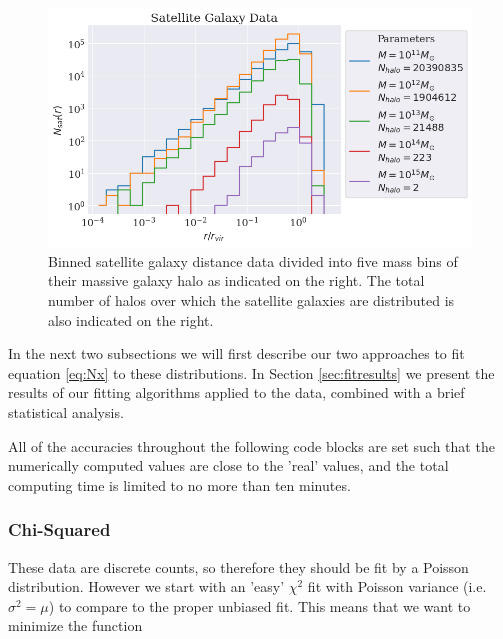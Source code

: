 \begin{figure}
    \centering
    \includegraphics[width=\textwidth]{results/satellite_data.png}
    \caption{Binned satellite galaxy distance data divided into five mass bins of their massive galaxy halo as indicated on the right. The total number of halos over which the satellite galaxies are distributed is also indicated on the right.}
    \label{fig:sat_data}
\end{figure}

In the next two subsections we will first describe our two approaches to fit equation \ref{eq:Nx} to these distributions. In Section \ref{sec:fitresults} we present the results of our fitting algorithms applied to the data, combined with a brief statistical analysis.

All of the accuracies throughout the following code blocks are set such that the numerically computed values are close to the 'real' values, and the total computing time is limited to no more than ten minutes.




\subsubsection{Chi-Squared}

These data are discrete counts, so therefore they should be fit by a Poisson distribution. However we start with an 'easy' $\chi^2$ fit with Poisson variance (i.e. $\sigma^2 = \mu$) to compare to the proper unbiased fit. This means that we want to minimize the function

